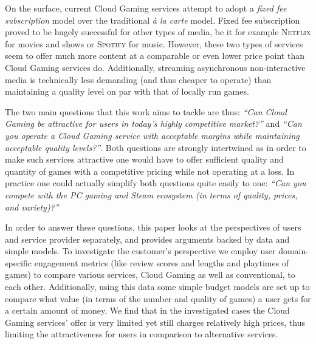 On the surface, current Cloud Gaming services attempt to adopt a 
\textit{fixed fee subscription} model over the traditional 
\textit{à la carte} model. 
Fixed fee subscription proved to be hugely successful for other 
types of media, be 
it for example \textsc{Netflix} for movies and shows or 
\textsc{Spotify} for music. However, these two types of services seem 
to offer much more content at a comparable or even lower price point 
than Cloud Gaming services do. Additionally, streaming asynchronous 
non-interactive media is technically less demanding 
(and thus cheaper to operate) than 
maintaining a quality level on par with that of locally run games.

The two main questions that this work aims to tackle are thus: 
\textit{``Can Cloud Gaming be attractive for users in today's highly 
competitive market?''} and \textit{``Can you operate a Cloud Gaming 
service with acceptable margins while maintaining acceptable quality 
levels?''}. Both questions are strongly intertwined as in order to make 
such services attractive one would have to offer sufficient quality and 
quantity of games with a competitive pricing while not operating at a 
loss. In practice one could actually simplify both questions quite 
easily to one: \textit{``Can you compete with the PC gaming and Steam 
ecosystem (in terms of quality, prices, and variety)?''}

In order to answer these questions, this paper looks at the perspectives 
of users and service provider separately, and provides arguments backed 
by data and simple models. To investigate the customer's perspective we 
employ user domain-specific engagement metrics (like 
review scores and lengths and playtimes of games) to 
compare various services, Cloud Gaming as well as conventional, 
to each other. Additionally, using this data some simple budget models 
are set up to compare what value (in terms of the number and quality of 
games) a user gets for a certain amount of money. 
We find that in the investigated 
cases the Cloud Gaming services' offer is very limited yet still 
charges relatively high prices, thus limiting the attractiveness for 
users in comparison to alternative services.

